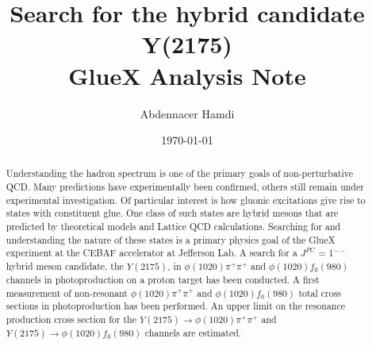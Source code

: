 \begin{titlepage}
  
  \title{{\bf Search for the hybrid candidate Y(2175)}\\
  GlueX Analysis Note}
  \author{Abdennacer Hamdi}
    \date{\today}

  \maketitle
  
  
  \begin{abstract}
    Understanding the hadron spectrum is one of the primary goals of non-perturbative QCD. Many predictions have experimentally been confirmed, others still remain under experimental investigation. Of particular interest is how gluonic excitations give rise to states with constituent glue. One class of such states are hybrid mesons that are predicted by theoretical models and Lattice QCD calculations. Searching for and understanding the nature of these states is a primary physics goal of the GlueX experiment at the CEBAF accelerator at Jefferson Lab. A search for a $J^{PC}$ = 1$^{--}$ hybrid meson candidate, the $Y(2175)$, in $\phi(1020)\pi^{+}\pi^{+}$ and $\phi(1020)f_{0}(980)$ channels in photoproduction on a proton target has been conducted. A first measurement of non-resonant $\phi(1020)\pi^{+}\pi^{+}$ and $\phi(1020)f_{0}(980)$ total cross sections in photoproduction has been performed. An upper limit on the resonance production cross section for the $Y(2175) \rightarrow \phi(1020)\pi^{+}\pi^{+}$ and $Y(2175) \rightarrow \phi(1020)f_0(980)$ channels are estimated.
  \end{abstract}

\end{titlepage}